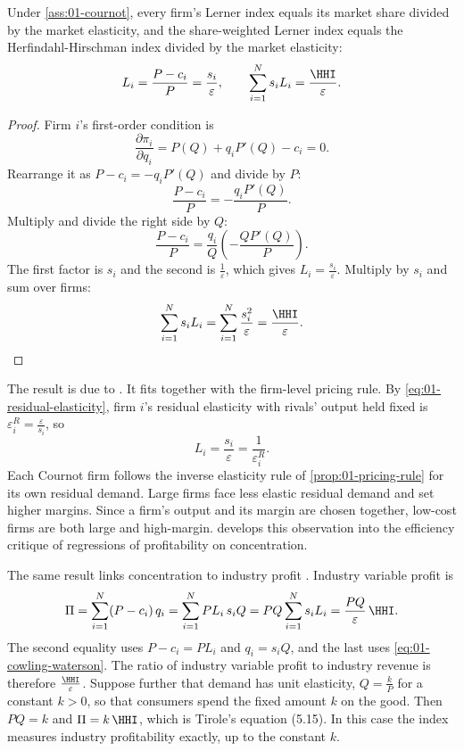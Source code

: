 \begin{proposition}\label{prop:01-cowling-waterson}
Under \cref{ass:01-cournot}, every firm's Lerner index equals its market share divided by the market elasticity,
and the share-weighted Lerner index equals the Herfindahl-Hirschman index divided by the market elasticity:
\begin{equation}\label{eq:01-cowling-waterson}
  L_i = \frac{P - c_i}{P} = \frac{s_i}{\varepsilon}, \qquad \sum_{i=1}^{N} s_i L_i = \frac{\HHI}{\varepsilon} .
\end{equation}
\end{proposition}

\begin{proof}
Firm $i$'s first-order condition is
\[
  \frac{\partial \pi_i}{\partial q_i} = P(Q) + q_i P'(Q) - c_i = 0 .
\]
Rearrange it as $P - c_i = -q_i P'(Q)$ and divide by $P$:
\[
  \frac{P - c_i}{P} = -\frac{q_i P'(Q)}{P} .
\]
Multiply and divide the right side by $Q$:
\[
  \frac{P - c_i}{P} = \frac{q_i}{Q}\left(-\frac{Q P'(Q)}{P}\right) .
\]
The first factor is $s_i$ and the second is $\frac{1}{\varepsilon}$, which gives $L_i = \frac{s_i}{\varepsilon}$.
Multiply by $s_i$ and sum over firms:
\[
  \sum_{i=1}^{N} s_i L_i = \sum_{i=1}^{N} \frac{s_i^2}{\varepsilon} = \frac{\HHI}{\varepsilon} . \qedhere
\]
\end{proof}

The result is due to \citet{CowlingWaterson1976}. It fits together with the firm-level pricing rule. By
\eqref{eq:01-residual-elasticity}, firm $i$'s residual elasticity with rivals' output held fixed is
$\varepsilon^R_i = \frac{\varepsilon}{s_i}$, so
\[
  L_i = \frac{s_i}{\varepsilon} = \frac{1}{\varepsilon^R_i} .
\]
Each Cournot firm follows the inverse elasticity rule of \cref{prop:01-pricing-rule} for its own residual demand.
Large firms face less elastic residual demand and set higher margins. Since a firm's output and its margin are
chosen together, low-cost firms are both large and high-margin.  develops this observation
into the efficiency critique of regressions of profitability on concentration.

The same result links concentration to industry profit \citep[Section~5.5, eq.~5.14 and Exercise~5.6]{Tirole1988}.
Industry variable profit is
\[
  \Pi = \sum_{i=1}^{N} (P - c_i)\, q_i = \sum_{i=1}^{N} P L_i\, s_i Q = PQ \sum_{i=1}^{N} s_i L_i
  = \frac{PQ}{\varepsilon}\,\HHI .
\]
The second equality uses $P - c_i = P L_i$ and $q_i = s_i Q$, and the last uses \eqref{eq:01-cowling-waterson}.
The ratio of industry variable profit to industry revenue is therefore $\frac{\HHI}{\varepsilon}$. Suppose further
that demand has unit elasticity, $Q = \frac{k}{P}$ for a constant $k > 0$, so that consumers spend the fixed
amount $k$ on the good. Then $PQ = k$ and $\Pi = k\,\HHI$, which is Tirole's equation (5.15). In this case the
index measures industry profitability exactly, up to the constant $k$.

